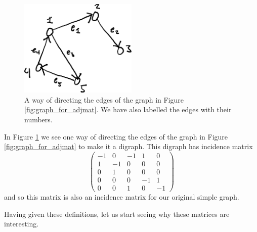 \documentclass[nobib]{tufte-handout}
\begin{document}
\begin{figure}
    \centering
    \includegraphics[width=0.5\textwidth]{graphics/L4_spectral/digraph_for_incmat.png}
    \caption{A way of directing the edges of the graph in Figure \ref{fig:graph_for_adjmat}. We have also labelled the edges with their numbers.}
    \label{fig:digraph_for_incmat}
\end{figure}

\begin{example}
    In Figure \ref{fig:digraph_for_incmat} we see one way of directing the edges of the graph in Figure \ref{fig:graph_for_adjmat} to make it a digraph. This digraph has incidence matrix
    $$\begin{pmatrix}
        -1 & 0 & -1 & 1 & 0 \\
        1 & -1 & 0 & 0 & 0 \\
        0 & 1 & 0 & 0 & 0 \\
        0 & 0 & 0 & -1 & 1 \\
        0 & 0 & 1 & 0 & -1 
        \end{pmatrix}$$
    and so this matrix is also an incidence matrix for our original simple graph.
\end{example}

Having given these definitions, let us start seeing why these matrices are interesting.
\end{document}
